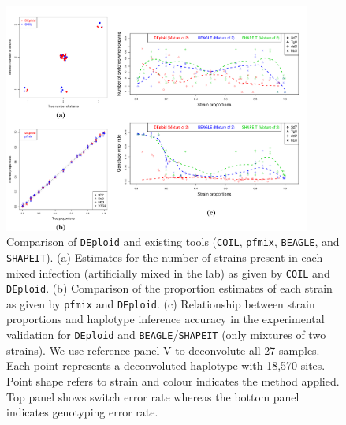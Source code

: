 \documentclass{bioinfo}
\begin{document}
\begin{figure}[htb]
\centerline{
\includegraphics[width=0.9\textwidth]{Fig3.pdf}
}
\caption{Comparison of \texttt{DEploid} and existing tools (\texttt{COIL}, \texttt{pfmix}, \texttt{BEAGLE}, and \texttt{SHAPEIT}). (a) Estimates for the number of strains present in each mixed infection (artificially mixed in the lab) as given by \texttt{COIL} and \texttt{DEploid}. (b) Comparison of the proportion estimates of each strain as given by \texttt{pfmix} and \texttt{DEploid}. (c) Relationship between strain proportions and haplotype inference accuracy in the experimental validation for \texttt{DEploid} and \texttt{BEAGLE}/\texttt{SHAPEIT} (only mixtures of two strains). We use reference panel V to deconvolute all 27 samples. Each point represents a deconvoluted haplotype with 18,570 sites. Point shape refers to strain and colour indicates the method applied. Top panel shows switch error rate whereas the bottom panel indicates genotyping error rate.}
\label{fig:switchVsMisCopy}
\end{figure}
\end{document}
